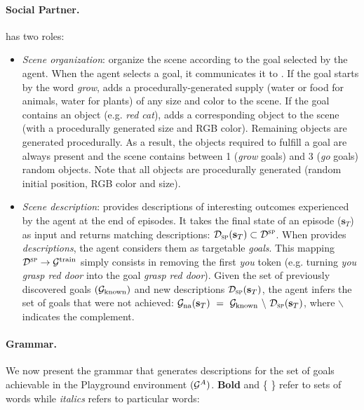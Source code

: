 \paragraph{Social Partner.} \SP has two roles:
\begin{itemize}
    \item \textit{Scene organization}: \SP organize the scene according to the goal selected by the agent. When the agent selects a goal, it communicates it to \SP. If the goal starts by the word \textit{grow}, \SP adds a procedurally-generated supply (water or food for animals, water for plants) of any size and color to the scene. If the goal contains an object (e.g. \textit{red cat}), \SP adds a corresponding object to the scene (with a procedurally generated size and RGB color). Remaining objects are generated procedurally. As a result, the objects required to fulfill a goal are always present and the scene contains between 1 (\textit{grow} goals) and 3 (\textit{go} goals) random objects. Note that all objects are procedurally generated (random initial position, RGB color and size).
    \item \textit{Scene description}: \SP provides \NL descriptions of interesting outcomes experienced by the agent at the end of episodes. It takes the final state of an episode ($\mathbf{s}_T$) as input and returns matching \NL descriptions: $\mathcal{D}_{\text{\textsc{sp}}}(\mathbf{s}_T) \subset \mathcal{D}^\text{\textsc{sp}}$. When \SP provides \textit{descriptions}, the agent considers them as targetable \textit{goals}. This mapping $\mathcal{D}^\text{\textsc{sp}}\to \mathcal{G}^{\text{train}}$ simply consists in removing the first \textit{you} token (e.g. turning \textit{you grasp red door} into the goal \textit{grasp red door}). Given the set of previously discovered goals $(\mathcal{G}_\text{known})$ and new descriptions $\mathcal{D}_{\text{\textsc{sp}}}(\mathbf{s}_T)$, the agent infers the set of goals that were not achieved: $\mathcal{G}_\text{na}(\mathbf{s}_T)~=~\mathcal{G}_\text{known}~\backslash~\mathcal{D}_\text{\textsc{sp}}(\mathbf{s}_T)$, where $\backslash$ indicates the complement.
\end{itemize}

\paragraph{Grammar.} We now present the grammar that generates descriptions for the set of goals achievable in the Playground environment $(\mathcal{G}^{A})$. \textbf{Bold} and \{ \} refer to sets of words while \textit{italics} refers to particular words:

